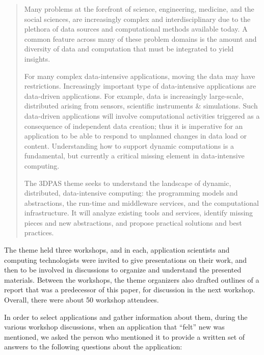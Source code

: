 \begin{quote}
Many problems at the forefront of science, engineering, medicine, and the social sciences, are increasingly complex and interdisciplinary due to the plethora of data sources and computational methods available today. A common feature across many of these problem domains is the amount and diversity of data and computation that must be integrated to yield insights.

For many complex data-intensive applications, moving the data may have restrictions. Increasingly important type of data-intensive applications are data-driven applications. For example, data is increasingly large-scale, distributed arising from sensors, scientific instruments \& simulations. Such data-driven applications will involve computational activities triggered as a consequence of independent data creation; thus it is imperative for an application to be able to respond to unplanned changes in data load or content. Understanding how to support dynamic computations is a fundamental, but currently a critical missing element in data-intensive computing.

The 3DPAS theme seeks to understand the landscape of dynamic, distributed, data-intensive computing: the programming models and abstractions, the run-time and middleware services, and the computational infrastructure. It will analyze existing tools and services, identify missing pieces and new abstractions, and propose practical solutions and best practices.
\end{quote}

The theme held three workshops, and in each, application scientists and computing technologists
were invited to give presentations on their work, and then to be involved in discussions to
organize and understand the presented materials.  Between the workshops, the theme
organizers also drafted outlines of a report that was a predecessor of this paper, for
discussion in the next workshop.  Overall, there were about 50 workshop attendees.

In order to select applications and gather information about
them, during the various workshop discussions, when an
application that ``felt'' new was mentioned, we asked the person who
mentioned it to provide a written set of answers to the following questions about the
application:

